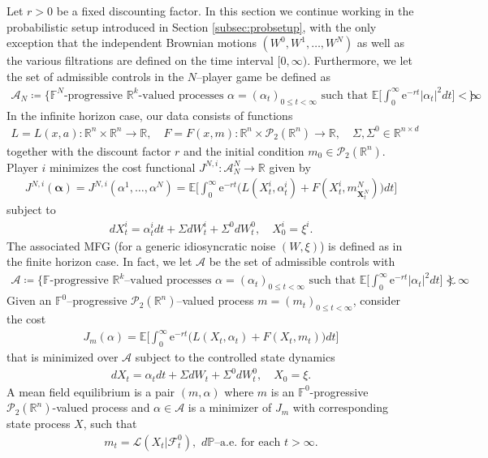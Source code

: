 \documentclass[11pt,reqno]{amsart}
\numberwithin{equation}{section}
\theoremstyle{definition}
\def\E{{\mathbb E}}
\def\R{{\mathbb R}}
\newcommand{\sP}{\mathcal{P}}
\newcommand{\bX}{\mathbf{X}}
\newcommand{\sL}{\mathcal{L}}
\newcommand{\bP}{\mathbb{P}}
\newcommand{\spt}{\mathcal{P}_2(\R^n)}
\newcommand{\sF}{\mathcal{F}}
\newcommand{\sA}{\mathcal{A}}
\newcommand{\bbF}{\mathbb{F}}
\def \E{\mathbb{E}}
\def \R{\mathbb{R}}
\def \e{\mathrm{e}}
\begin{document}
Let $r>0$ be a fixed discounting factor.
In this section we continue working in the probabilistic setup introduced in Section \ref{subsec:probsetup}, with the only exception that the independent Brownian motions $(W^0,W^1,\dots,W^N)$ as well as the various filtrations are defined on the time interval $[0,\infty)$.
Furthermore, we let the set of admissible controls in the $N$--player game be defined as
\begin{align} \label{def.an.inf}
  \sA_N \coloneqq \bigg\{\text{$\bbF^N$-progressive $\R^k$-valued processes $\alpha = (\alpha_t)_{0 \leq t <\infty }$ such that $\E\Big[\int_0^\infty\e^{-rt} |\alpha_t|^2 dt\Big] < \infty$ } \bigg\}.
\end{align}
In the infinite horizon case, our data consists of functions 
\begin{align*}
L = L(x,a) : \R^n \times \R^n \to \R, \quad F = F(x,m) : \R^n \times \spt \to \R, \quad \Sigma, \Sigma^0 \in \R^{n \times d}
\end{align*}
together with the discount factor $r$ and the initial condition $m_0 \in \spt$. 
Player $i$ minimizes the cost functional $J^{N,i}:\sA_N^N\to \R$ given by
\begin{align*}
  J^{N,i}(\bm \alpha) = J^{N,i}(\alpha^1,\dots,\alpha^N) = \E\bigg[ \int_0^\infty\e^{-rt} \big(L(X_t^i,\alpha_t^i) + F(X_t^i,m_{\bX_t^N}^N) \big) dt  \bigg]
\end{align*}
subject to
\begin{align*}
  dX_t^i =  \alpha_t^i dt + \Sigma dW_t^i + \Sigma^0 dW_t^0, \quad X_0^i = \xi^i.
\end{align*}
The associated MFG (for a generic idiosyncratic noise $(W, \xi)$) is defined as in the finite horizon case.
In fact, we let $\sA$ be the set of admissible controls with
\begin{align} \label{def.an.mfg}
  \sA \coloneqq \bigg\{\text{$\bbF$-progressive $\R^k$--valued processes $\alpha = (\alpha_t)_{0 \leq t<\infty}$ such that $\E\Big[\int_0^\infty\e^{-rt} |\alpha_t|^2 dt\Big] < \infty$ } \bigg\}.
\end{align}
Given an $\bbF^0$--progressive $\sP_2(\R^n)$--valued process $m = (m_t)_{0\le t<\infty}$, consider the cost
\begin{align} \label{mfoptinf}
  J_m(\alpha) = \E\bigg[  \int_0^\infty\e^{-rt} \big( L(X_t, \alpha_t) + F(X_t,m_t) \big) dt  \bigg]
\end{align}
that is minimized over $\sA$
subject to the controlled state dynamics
\begin{align} \label{dynamicsdef.inf}
  dX_t =  \alpha_t dt +\Sigma d W_t + \Sigma^0d W_t^0, \quad X_0 = \xi. 
\end{align}
A mean  field equilibrium is a pair $(m, \alpha)$ where $m$ is an $\bbF^0$-progressive $\sP_2(\R^n)$-valued process and $\alpha \in \sA$ is a minimizer of $J_{m}$ with corresponding state process $X$, such that
\begin{align}
  m_t = \sL(X_t | \sF_t^0), \,\, d\bP\text{--a.e. for each } t>\infty.
\end{align}
\end{document}
